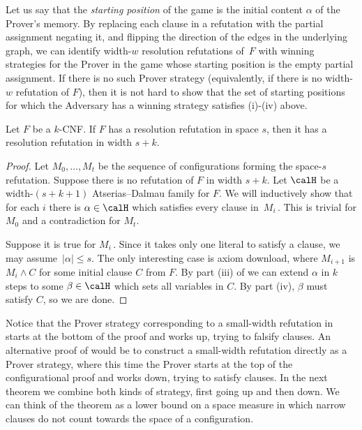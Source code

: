\documentclass{toc}
\begin{document}
Let us say that the \emph{starting position} of the game is
the initial content $\alpha$ of the Prover's memory.
By replacing each clause in a refutation
with the partial assignment negating it, and flipping the 
direction of the edges in the underlying graph,
we can identify width-$w$ resolution refutations of~$F$ with winning strategies for the Prover in the game whose starting position is the empty partial assignment. 
If there is no such Prover strategy (equivalently, if there is 
no width-$w$ refutation of $F$), then it is not 
hard to show that the set of starting positions for
which the Adversary has a winning strategy 
satisfies (i)-(iv) above.




\begin{theorem}  \label{lem:width_space_resolution}
Let $F$ be a $k$-CNF. If $F$ has a resolution refutation in space $s$, 
then it has a resolution refutation in width $s+k$.
\end{theorem}

\begin{proof}
Let $M_0, \dots, M_t$ be the sequence of configurations forming the 
space-$s$ refutation. 
Suppose there is no refutation of $F$ in width $s+k$. Let $\calH$ be a 
width-$(s+k+1)$ Atserias--Dalmau family for $F$.
We will inductively show that for each $i$ there is $\alpha \in \calH$ 
which satisfies every clause in~$M_i$\,. This is trivial for $M_0$ and a contradiction for $M_t$.

Suppose it is true for $M_i$\,. Since it takes only one literal to satisfy a clause,
we may assume~$|\alpha| \le s$. The only interesting case is axiom download,
where $M_{i+1}$ is $M_i \wedge C$ for some initial clause $C$ from $F$.
By part (iii) of  we can extend $\alpha$ in $k$
steps to some $\beta \in \calH$ which sets all variables in $C$.
By part (iv), $\beta$ must satisfy $C$, so we are done. 
\end{proof}

Notice that the Prover strategy corresponding to a small-width refutation
in 
starts at the bottom of the proof and works up, trying to falsify
clauses.
An alternative proof of 
would be to construct a small-width refutation directly as a Prover strategy, where this time
the Prover starts at the top of the configurational proof and works down, trying to
satisfy clauses. In the next theorem we combine both kinds of strategy, first going up and then down.
We can think of the theorem as a lower bound on a space measure
in which narrow clauses do not count towards the space of a configuration.
\end{document}
